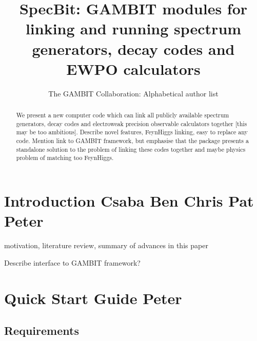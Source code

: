 \documentclass[11pt,a4paper]{article}
\title{SpecBit: GAMBIT modules for linking and running spectrum generators, decay codes and EWPO calculators}
\author{The GAMBIT Collaboration: Alphabetical author list} %
\newcommand{\Ben}[1]{{\bf\color{magenta}Ben #1}}
\newcommand{\Csaba}[1]{{\bf\color{orange}Csaba #1}}
\newcommand{\Chris}[1]{{\bf\color{yellow}Chris #1}}
\newcommand{\Pat}[1]{{\bf\color{cyan}Pat #1}}
\newcommand{\Peter}[1]{{\bf\color{green}Peter #1}}
\begin{document}
\maketitle

\begin{abstract}
We present a new computer code which can link all publicly available spectrum generators, decay codes and electroweak precision observable calculators together 
[this may be too ambitious].
Describe novel features, FeynHiggs linking, easy to replace any code. Mention link to GAMBIT framework, but emphasise that the package presents a standalone solution to the problem of linking these codes together and maybe physics problem of matching too FeynHiggs.
\end{abstract}

\tableofcontents


\section{Introduction \Csaba{} \Ben{} \Chris{} \Pat{} \Peter{}}

motivation, literature review, summary of advances in this paper




Describe interface to GAMBIT framework? 

\section{Quick Start Guide \Peter{}}

\subsection*{Requirements}
\end{document}
